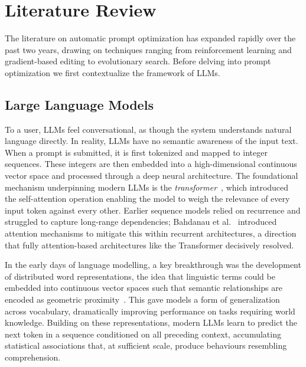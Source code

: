 \documentclass[conference]{IEEEtran}
\begin{document}
\section{Literature Review}
\label{sec:related}

The literature on automatic prompt optimization has expanded rapidly over the past two years,
drawing on techniques ranging from reinforcement learning and gradient-based editing to
evolutionary search. Before delving into prompt optimization we first contextualize the
framework of LLMs.

\subsection{Large Language Models}

To a user, LLMs feel conversational, as though the system understands natural language
directly. In reality, LLMs have no semantic awareness of the input text. When a prompt is
submitted, it is first tokenized and mapped to integer sequences. These integers are then
embedded into a high-dimensional continuous vector space and processed through a deep
neural architecture. The foundational mechanism underpinning modern LLMs is the
\textit{transformer}~\cite{vaswani2017attention}, which introduced the self-attention
operation enabling the model to weigh the relevance of every input token against every
other. Earlier sequence models relied on recurrence and struggled to capture long-range
dependencies; Bahdanau et al.~\cite{bahdanau2015attention} introduced attention mechanisms
to mitigate this within recurrent architectures, a direction that fully attention-based
architectures like the Transformer decisively resolved.

In the early days of language modelling, a key breakthrough was the development of
distributed word representations, the idea that linguistic terms could be embedded into
continuous vector spaces such that semantic relationships are encoded as geometric
proximity~\cite{mikolov2013word2vec}. This gave models a form of generalization across
vocabulary, dramatically improving performance on tasks requiring world knowledge. Building
on these representations, modern LLMs learn to predict the next token in a sequence
conditioned on all preceding context, accumulating statistical associations that, at
sufficient scale, produce behaviours resembling comprehension.
\end{document}
